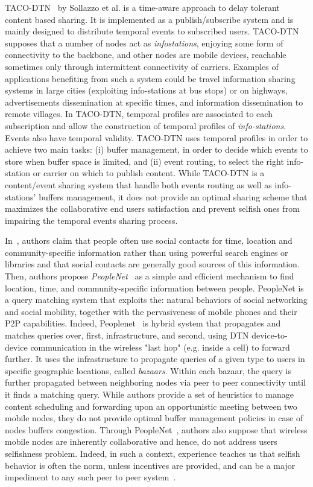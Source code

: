 TACO-DTN~\cite{TACODTN} by Sollazzo et al. is a time-aware approach to delay tolerant content based sharing. It is implemented as a publish/subscribe system and is mainly designed to distribute temporal events to subscribed users. TACO-DTN supposes that a number of nodes act as \emph{infostations}, enjoying some form of connectivity to the backbone, and other nodes are mobile devices, reachable sometimes only through intermittent connectivity of carriers. Examples of applications benefiting from such a system could be travel information sharing systems in large cities (exploiting info-stations at bus stops) or on highways, advertisements dissemination at specific times, and information dissemination to remote villages. In TACO-DTN, temporal profiles are associated to each subscription and allow the construction of temporal profiles of \emph{info-stations}. Events also have temporal validity. TACO-DTN uses temporal profiles in order to achieve two main tasks: (i) buffer management, in order to decide which events to store when buffer space is limited, and (ii) event routing, to select the right info-station or carrier on which to publish content. While TACO-DTN is a content/event sharing system that handle both events routing as well as info-stations' buffers management, it does not provide an optimal sharing scheme that maximizes the collaborative end users satisfaction and prevent selfish ones from impairing the temporal events sharing process.

In~\cite{Peoplenet}, authors claim that people often use social contacts for time, location and community-specific information rather than using powerful search engines or libraries and that social contacts are generally good sources of this information. Then, authors propose \emph{PeopleNet}~\cite{Peoplenet} as a simple and efficient mechanism to find location, time, and community-specific information between people. PeopleNet is a query matching system that exploits the: natural behaviors of social networking and social mobility, together with the pervasiveness of mobile phones and their P2P capabilities. Indeed, Peoplenet~\cite{Peoplenet} is hybrid system that propagates and matches queries over, first, infrastructure, and second, using DTN device-to-device communication in the wireless "last hop" (e.g. inside a cell) to forward further. It uses the infrastructure to propagate queries of a given type to users in specific geographic locations, called \emph{bazaars}. Within each bazaar, the query is further propagated between neighboring nodes via peer to peer connectivity until it finds a matching query. While authors provide a set of heuristics to manage content scheduling and forwarding upon an opportunistic meeting between two mobile nodes, they do not provide optimal buffer management policies in case of nodes buffers congestion. Through PeopleNet~\cite{Peoplenet}, authors also suppose that wireless mobile nodes are inherently collaborative and hence, do not address users selfishness problem. Indeed, in such a context, experience teaches us that selfish behavior is often the norm, unless incentives are provided, and can be a major impediment to any such peer to peer system~\cite{NashEquilibria}.
  
